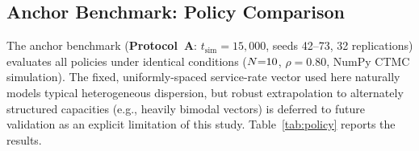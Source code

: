 \subsection{Anchor Benchmark: Policy Comparison}
\label{sec:exp:policy}

The anchor benchmark (\textbf{Protocol~A}: $t_{\mathrm{sim}}{=}15{,}000$, seeds 42--73, 32 replications) evaluates all policies under identical conditions ($N{=}10$, $\rho{=}0.80$, NumPy CTMC simulation). The fixed, uniformly-spaced service-rate vector used here naturally models typical heterogeneous dispersion, but robust extrapolation to alternately structured capacities (e.g., heavily bimodal vectors) is deferred to future validation as an explicit limitation of this study.
Table~\ref{tab:policy} reports the results.

